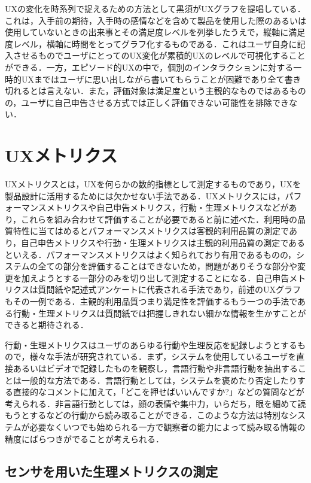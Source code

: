 UXの変化を時系列で捉えるための方法として黒須がUXグラフ\cite{kurosu2015}を提唱している．これは，入手前の期待，入手時の感情などを含めて製品を使用した際のあるいは使用していないときの出来事とその満足度レベルを列挙したうえで，縦軸に満足度レベル，横軸に時間をとってグラフ化するものである．これはユーザ自身に記入させるものでユーザにとってのUX変化が累積的UXのレベルで可視化することができる．一方，エピソード的UXの中で，個別のインタラクションに対する一時的UXまではユーザに思い出しながら書いてもらうことが困難であり全て書き切れるとは言えない．また，評価対象は満足度という主観的なものではあるものの，ユーザに自己申告させる方式では正しく評価できない可能性を排除できない．

\section{UXメトリクス}

UXメトリクスとは，UXを何らかの数的指標として測定するものであり，UXを製品設計に活用するためには欠かせない手法である．UXメトリクスには，パフォーマンスメトリクスや自己申告メトリクス，行動・生理メトリクスなどがあり\cite{tullis2014}，これらを組み合わせて評価することが必要であると前に述べた．利用時の品質特性に当てはめるとパフォーマンスメトリクスは客観的利用品質の測定であり，自己申告メトリクスや行動・生理メトリクスは主観的利用品質の測定であるといえる．パフォーマンスメトリクスはよく知られており有用であるものの，システムの全ての部分を評価することはできないため，問題がありそうな部分や変更を加えようとする一部分のみを切り出して測定することになる．自己申告メトリクスは質問紙や記述式アンケートに代表される手法であり，前述のUXグラフもその一例である．主観的利用品質つまり満足性を評価するもう一つの手法である行動・生理メトリクスは質問紙では把握しきれない細かな情報を生かすことができると期待される．

行動・生理メトリクスはユーザのあらゆる行動や生理反応を記録しようとするもので，様々な手法が研究されている．まず，システムを使用しているユーザを直接あるいはビデオで記録したものを観察し，言語行動や非言語行動を抽出することは一般的な方法である．言語行動としては，システムを褒めたり否定したりする直接的なコメントに加えて，「どこを押せばいいんですか?」などの質問などが考えられる．非言語行動としては，顔の表情や集中力，いらだち，眼を細めて読もうとするなどの行動から読み取ることができる．このような方法は特別なシステムが必要なくいつでも始められる一方で観察者の能力によって読み取る情報の精度にばらつきがでることが考えられる．

\subsection{センサを用いた生理メトリクスの測定}

